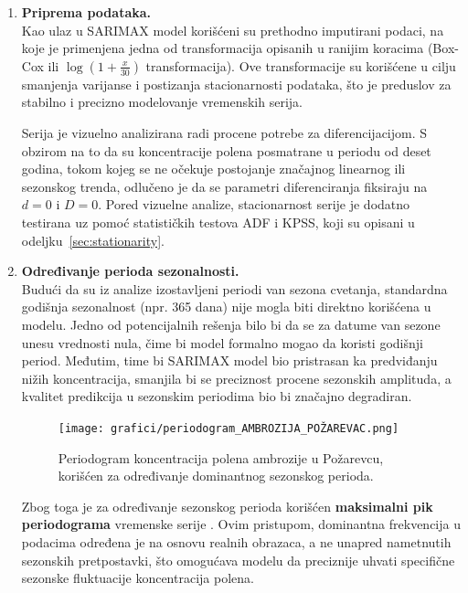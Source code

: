 \documentclass[12pt]{article}
\begin{document}
\begin{enumerate}
    \item \textbf{Priprema podataka.} \\
    Kao ulaz u SARIMAX model korišćeni su prethodno imputirani podaci, na koje je primenjena jedna od transformacija opisanih u ranijim koracima (Box-Cox ili $\log(1 + \frac{x}{30})$ transformacija). Ove transformacije su korišćene u cilju smanjenja varijanse i postizanja stacionarnosti podataka, što je preduslov za stabilno i precizno modelovanje vremenskih serija.

    Serija je vizuelno analizirana radi procene potrebe za diferencijacijom. S obzirom na to da su koncentracije polena posmatrane u periodu od deset godina, tokom kojeg se ne očekuje postojanje značajnog linearnog ili sezonskog trenda, odlučeno je da se parametri diferenciranja fiksiraju na $d=0$ i $D=0$.
    Pored vizuelne analize, stacionarnost serije je dodatno testirana uz pomoć statističkih testova ADF i KPSS, koji su opisani u odeljku~\ref{sec:stationarity}.


    \item \textbf{Određivanje perioda sezonalnosti.} \\
    Budući da su iz analize izostavljeni periodi van sezona cvetanja, standardna godišnja sezonalnost (npr. 365 dana) nije mogla biti direktno korišćena u modelu. Jedno od potencijalnih rešenja bilo bi da se za datume van sezone unesu vrednosti nula, čime bi model formalno mogao da koristi godišnji period. Međutim, time bi SARIMAX model bio pristrasan ka predviđanju nižih koncentracija, smanjila bi se preciznost procene sezonskih amplituda, a kvalitet predikcija u sezonskim periodima bio bi značajno degradiran.

    \begin{figure}[H]
        \centering
        \texttt{[image: grafici/periodogram\_AMBROZIJA\_POŽAREVAC.png]}
        \caption{Periodogram koncentracija polena ambrozije u Požarevcu, korišćen za određivanje dominantnog sezonskog perioda.}
        \label{fig:periodogram_ambrozija}
    \end{figure}
    Zbog toga je za određivanje sezonskog perioda korišćen \textbf{maksimalni pik periodograma} vremenske serije \cite{yule1927, slutsky1937}. Ovim pristupom, dominantna frekvencija u podacima određena je na osnovu realnih obrazaca, a ne unapred nametnutih sezonskih pretpostavki, što omogućava modelu da preciznije uhvati specifične sezonske fluktuacije koncentracija polena.



\end{enumerate}
\end{document}
